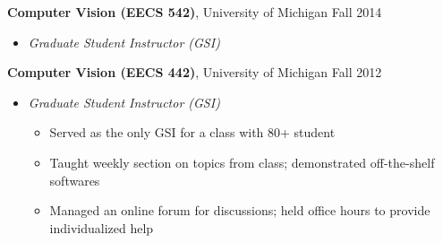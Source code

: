 \documentclass[10pt]{article}
\newenvironment{innerlist}[1][\enskip\textbullet]%
        {\begin{itemize}[#1,leftmargin=*,parsep=0pt,itemsep=0pt,topsep=0pt,partopsep=0pt]}
        {\end{itemize}}
\begin{document}
\textbf{Computer Vision (EECS 542)}, University of Michigan \hfill {Fall 2014} \\
\vspace{-.15in}
\begin{innerlist}
\item[] \emph{Graduate Student Instructor (GSI)} \\
    \vspace{-.15in}
\end{innerlist}
\vspace{.1in}
\textbf{Computer Vision (EECS 442)}, University of Michigan \hfill {Fall 2012} \\
\vspace{-.15in}
\begin{innerlist}
\item[] \emph{Graduate Student Instructor (GSI)} \\
    \vspace{-.15in}	
    \begin{innerlist}
    \item Served as the only GSI for a class with 80+ student
    \item Taught weekly section on topics from class; demonstrated off-the-shelf softwares
    \item Managed an online forum for discussions; held office hours to provide individualized help
    \end{innerlist}
\end{innerlist}
\end{document}
